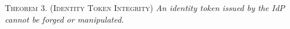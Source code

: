 
\newc
\vspace{3mm}
\noindent\textsc{Theorem 3. (Identity Token Integrity)} {\em An identity token issued by the IdP cannot be forged or manipulated.}




